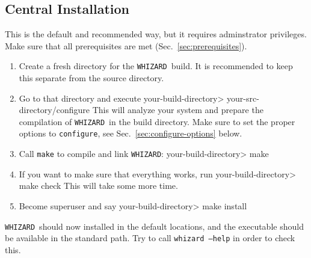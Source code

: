 \documentclass[12pt]{book}
\newenvironment{interaction}%
  {\begingroup\small
   \Verbatim}%
  {\endVerbatim
   \endgroup\noindent}
\newcommand{\ttt}[1]{\texttt{#1}}
\newcommand{\whizard}{\ttt{WHIZARD}}
\begin{document}
\subsection{Central Installation}
This is the default and recommended way, but it requires adminstrator
privileges.  Make sure that all
prerequisites are met (Sec.~\ref{sec:prerequisites}).
\begin{enumerate}
\item
  Create a fresh directory for the \whizard\ build.  It is recommended
  to keep this separate from the source directory.
\item
  Go to that directory and execute
  \begin{interaction}
    your-build-directory> your-src-directory/configure
  \end{interaction}
  This will analyze your system and prepare the compilation of \whizard\
  in the build directory.  Make sure to set the proper options to
  \ttt{configure}, see Sec.~\ref{sec:configure-options} below.
\item
  Call \ttt{make} to compile and link \whizard:
  \begin{interaction}
    your-build-directory> make
  \end{interaction}
\item
  If you want to make sure that everything works, run
  \begin{interaction}
    your-build-directory> make check
  \end{interaction}
  This will take some more time.
\item
  Become superuser and say
  \begin{interaction}
    your-build-directory> make install
  \end{interaction}
\end{enumerate}
\whizard\ should now installed in the default locations, and the
executable should be available in the standard path.  Try to call
\ttt{whizard --help} in order to check this.
\end{document}
